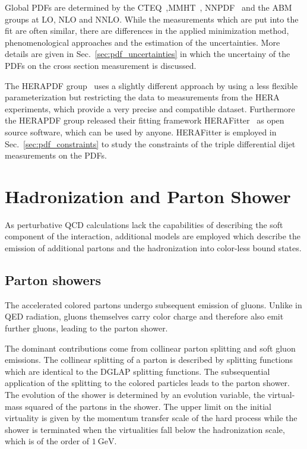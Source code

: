 Global PDFs are determined by the
CTEQ~\cite{Dulat:2015mca},MMHT~\cite{Harland-Lang:2014zoa},
NNPDF~\cite{Ball:2014uwa} and the ABM~\cite{Alekhin:2013nda} groups at LO, NLO
and NNLO. While the measurements which are put into the fit are often similar,
there are differences in the applied minimization method, phenomenological
approaches and the estimation of the uncertainties. More details are given in
Sec.~\ref{sec:pdf_uncertainties} in which the uncertainy of the PDFs on the
cross section measurement is discussed.

The HERAPDF group~\cite{Abramowicz:2015mha} uses a slightly different approach
by using a less flexible parameterization but restricting the data to
measurements from the HERA experiments, which provide a very precise and
compatible dataset. Furthermore the HERAPDF group released their fitting
framework HERAFitter~\cite{Alekhin:2014irh} as open source software, which can
be used by anyone.  HERAFitter is employed in Sec.~\ref{sec:pdf_constraints} to
study the constraints of the triple differential dijet measurements on the PDFs.

\section{Hadronization and Parton Shower}

As perturbative QCD calculations lack the capabilities of describing the
soft component of the interaction, additional models are employed which describe
the emission of additional partons and the hadronization into color-less bound
states. 

\subsection{Parton showers}

The accelerated colored partons undergo subsequent emission of gluons. Unlike in
QED radiation, gluons themselves carry color charge and therefore also emit
further gluons, leading to the parton shower. 

The dominant contributions come from collinear parton splitting and soft gluon
emissions. The collinear splitting of a parton is described by splitting
functions which are identical to the DGLAP splitting functions. The
subsequential application of the splitting to the colored particles leads to the
parton shower. The evolution of the shower is determined by an evolution
variable, \eg the virtual-mass squared of the partons in the shower. The upper
limit on the initial virtuality is given by the momentum transfer scale of the
hard process while the shower is terminated when the virtualities fall below the
hadronization scale, which is of the order of $\SI{1}{\GeV}$.

